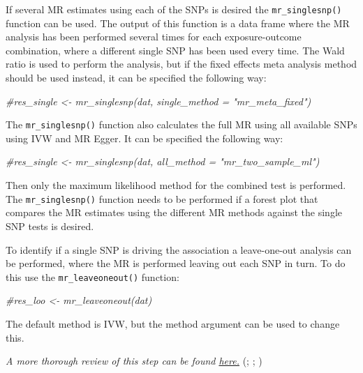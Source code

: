 \documentclass[
]{article}
\newenvironment{Shaded}{\begin{snugshade}}{\end{snugshade}}
\newcommand{\CommentTok}[1]{\textcolor[rgb]{0.56,0.35,0.01}{\textit{#1}}}
\begin{document}
If several MR estimates using each of the SNPs is desired the
\texttt{mr\_singlesnp()} function can be used. The output of this
function is a data frame where the MR analysis has been performed
several times for each exposure-outcome combination, where a different
single SNP has been used every time. The Wald ratio is used to perform
the analysis, but if the fixed effects meta analysis method should be
used instead, it can be specified the following way:

\begin{Shaded}
\begin{Highlighting}[]
\CommentTok{\#res\_single \textless{}{-} mr\_singlesnp(dat, single\_method = "mr\_meta\_fixed")}
\end{Highlighting}
\end{Shaded}

The \texttt{mr\_singlesnp()} function also calculates the full MR using
all available SNPs using IVW and MR Egger. It can be specified the
following way:

\begin{Shaded}
\begin{Highlighting}[]
\CommentTok{\#res\_single \textless{}{-} mr\_singlesnp(dat, all\_method = "mr\_two\_sample\_ml")}
\end{Highlighting}
\end{Shaded}

Then only the maximum likelihood method for the combined test is
performed. The \texttt{mr\_singlesnp()} function needs to be performed
if a forest plot that compares the MR estimates using the different MR
methods against the single SNP tests is desired.

To identify if a single SNP is driving the association a leave-one-out
analysis can be performed, where the MR is performed leaving out each
SNP in turn. To do this use the \texttt{mr\_leaveoneout()} function:

\begin{Shaded}
\begin{Highlighting}[]
\CommentTok{\#res\_loo \textless{}{-} mr\_leaveoneout(dat)}
\end{Highlighting}
\end{Shaded}

The default method is IVW, but the method argument can be used to change
this.

\emph{A more thorough review of this step can be found
\href{https://mrcieu.github.io/TwoSampleMR/articles/perform_mr.html}{here.}}
(;
;
)
\end{document}
